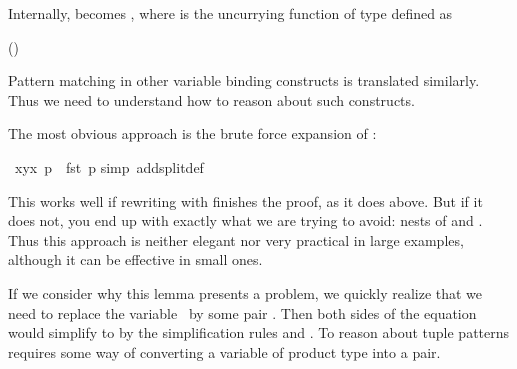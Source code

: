 \begin{isabellebody}
\begin{isamarkuptext}
Internally,  becomes , where
 is the uncurrying function of type  defined as
\begin{center}
\hfill()
\end{center}
Pattern matching in
other variable binding constructs is translated similarly. Thus we need to
understand how to reason about such constructs.%
\end{isamarkuptext}%
\isamarkuptrue%
%
\isamarkuptrue%
%
\begin{isamarkuptext}%
The most obvious approach is the brute force expansion of :%
\end{isamarkuptext}%
\isamarkuptrue%
\ {\isachardoublequote}{\isacharparenleft}{\isasymlambda}{\isacharparenleft}x{\isacharcomma}y{\isacharparenright}{\isachardot}x{\isacharparenright}\ p\ {\isacharequal}\ fst\ p{\isachardoublequote}\isanewline
\isamarkupfalse%
simp\ add{\isacharcolon}split{\isacharunderscore}def{\isacharparenright}\isamarkupfalse%
%
\begin{isamarkuptext}%
This works well if rewriting with  finishes the
proof, as it does above.  But if it does not, you end up with exactly what
we are trying to avoid: nests of  and . Thus this
approach is neither elegant nor very practical in large examples, although it
can be effective in small ones.

If we consider why this lemma presents a problem, 
we quickly realize that we need to replace the variable~ by some pair .  Then both sides of the
equation would simplify to  by the simplification rules
 and .  
To reason about tuple patterns requires some way of
converting a variable of product type into a pair.


\end{isamarkuptext}
\end{isabellebody}
